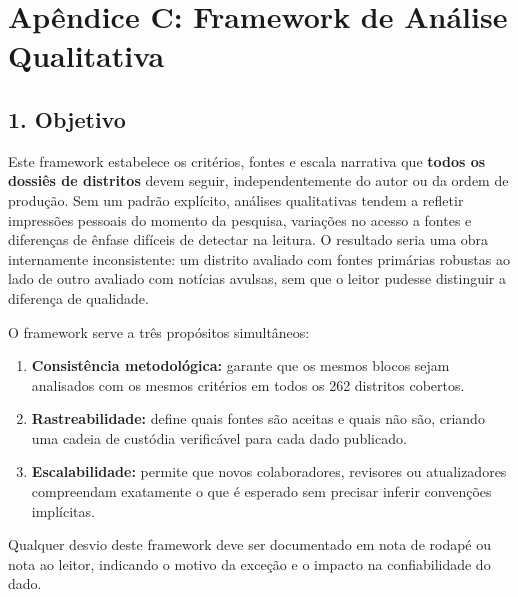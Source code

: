 
\chapter*{Apêndice C: Framework de Análise Qualitativa}
\label{apendice:qualitativo}

\section*{1. Objetivo}

Este framework estabelece os critérios, fontes e escala narrativa que \textbf{todos os dossiês de distritos} devem seguir, independentemente do autor ou da ordem de produção. Sem um padrão explícito, análises qualitativas tendem a refletir impressões pessoais do momento da pesquisa, variações no acesso a fontes e diferenças de ênfase difíceis de detectar na leitura. O resultado seria uma obra internamente inconsistente: um distrito avaliado com fontes primárias robustas ao lado de outro avaliado com notícias avulsas, sem que o leitor pudesse distinguir a diferença de qualidade.

O framework serve a três propósitos simultâneos:

\begin{enumerate}
  \item \textbf{Consistência metodológica:} garante que os mesmos blocos sejam analisados com os mesmos critérios em todos os 262 distritos cobertos.
  \item \textbf{Rastreabilidade:} define quais fontes são aceitas e quais não são, criando uma cadeia de custódia verificável para cada dado publicado.
  \item \textbf{Escalabilidade:} permite que novos colaboradores, revisores ou atualizadores compreendam exatamente o que é esperado sem precisar inferir convenções implícitas.
\end{enumerate}

Qualquer desvio deste framework deve ser documentado em nota de rodapé ou nota ao leitor, indicando o motivo da exceção e o impacto na confiabilidade do dado.

